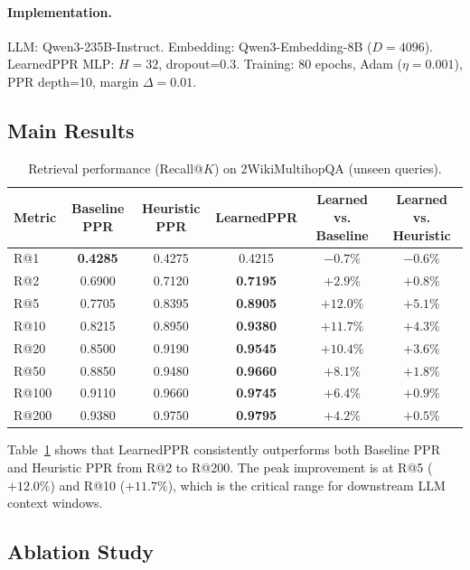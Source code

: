 \documentclass[conference,a4paper]{IEEEtran}
\begin{document}
\paragraph{Implementation.}
LLM: Qwen3-235B-Instruct. Embedding: Qwen3-Embedding-8B ($D=4096$). LearnedPPR MLP: $H=32$, dropout=0.3. Training: 80 epochs, Adam ($\eta=0.001$), PPR depth=10, margin $\Delta=0.01$.

\subsection{Main Results}

\begin{table}[t]
\centering
\small
\begin{tabular}{l ccc cc}
\toprule
\textbf{Metric} & \textbf{Baseline PPR} & \textbf{Heuristic PPR} & \textbf{LearnedPPR} & \textbf{Learned vs. Baseline} & \textbf{Learned vs. Heuristic} \\
\midrule
R@1   & \textbf{0.4285} & 0.4275 & 0.4215 & $-0.7\%$ & $-0.6\%$ \\
R@2   & 0.6900 & 0.7120 & \textbf{0.7195} & $+2.9\%$ & $+0.8\%$ \\
R@5   & 0.7705 & 0.8395 & \textbf{0.8905} & $\mathbf{+12.0\%}$ & $\mathbf{+5.1\%}$ \\
R@10  & 0.8215 & 0.8950 & \textbf{0.9380} & $\mathbf{+11.7\%}$ & $\mathbf{+4.3\%}$ \\
R@20  & 0.8500 & 0.9190 & \textbf{0.9545} & $+10.4\%$ & $+3.6\%$ \\
R@50  & 0.8850 & 0.9480 & \textbf{0.9660} & $+8.1\%$  & $+1.8\%$ \\
R@100 & 0.9110 & 0.9660 & \textbf{0.9745} & $+6.4\%$  & $+0.9\%$ \\
R@200 & 0.9380 & 0.9750 & \textbf{0.9795} & $+4.2\%$  & $+0.5\%$ \\
\bottomrule
\end{tabular}
\caption{Retrieval performance (Recall@$K$) on 2WikiMultihopQA (unseen queries).}
\label{tab:main_results}
\end{table}

Table~\ref{tab:main_results} shows that LearnedPPR consistently outperforms both Baseline PPR and Heuristic PPR from R@2 to R@200. The peak improvement is at R@5 ($+12.0\%$) and R@10 ($+11.7\%$), which is the critical range for downstream LLM context windows.

\subsection{Ablation Study}
\end{document}
